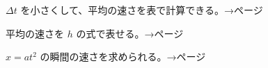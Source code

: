 \begin{furikaeri}
\begin{checklist}
\item $\Delta t$ を小さくして、平均の速さを表で計算できる。\hfill{\footnotesize\sffamily\color{bkTheme}→\pageref{bk:5-2:hyou}ページ}
\item 平均の速さを $h$ の式で表せる。\hfill{\footnotesize\sffamily\color{bkTheme}→\pageref{bk:5-2:h}ページ}
\item $x=at^2$ の瞬間の速さを求められる。\hfill{\footnotesize\sffamily\color{bkTheme}→\pageref{bk:5-2:a}ページ}
\end{checklist}
\end{furikaeri}

